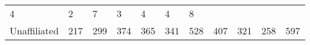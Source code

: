 \documentclass[]{article}
\begin{document}
\begin{longtable}[]{@{}lllllllllll@{}}
\begin{minipage}[t]{0.05\columnwidth}
4\strut
\end{minipage} & \begin{minipage}[t]{0.05\columnwidth}\raggedright\strut
2\strut
\end{minipage} & \begin{minipage}[t]{0.05\columnwidth}\raggedright\strut
7\strut
\end{minipage} & \begin{minipage}[t]{0.06\columnwidth}\raggedright\strut
3\strut
\end{minipage} & \begin{minipage}[t]{0.06\columnwidth}\raggedright\strut
4\strut
\end{minipage} & \begin{minipage}[t]{0.04\columnwidth}\raggedright\strut
4\strut
\end{minipage} & \begin{minipage}[t]{0.11\columnwidth}\raggedright\strut
8\strut
\end{minipage}\tabularnewline
\begin{minipage}[t]{0.14\columnwidth}\raggedright\strut
Unaffiliated\strut
\end{minipage} & \begin{minipage}[t]{0.04\columnwidth}\raggedright\strut
217\strut
\end{minipage} & \begin{minipage}[t]{0.05\columnwidth}\raggedright\strut
299\strut
\end{minipage} & \begin{minipage}[t]{0.05\columnwidth}\raggedright\strut
374\strut
\end{minipage} & \begin{minipage}[t]{0.05\columnwidth}\raggedright\strut
365\strut
\end{minipage} & \begin{minipage}[t]{0.05\columnwidth}\raggedright\strut
341\strut
\end{minipage} & \begin{minipage}[t]{0.05\columnwidth}\raggedright\strut
528\strut
\end{minipage} & \begin{minipage}[t]{0.06\columnwidth}\raggedright\strut
407\strut
\end{minipage} & \begin{minipage}[t]{0.06\columnwidth}\raggedright\strut
321\strut
\end{minipage} & \begin{minipage}[t]{0.04\columnwidth}\raggedright\strut
258\strut
\end{minipage} & \begin{minipage}[t]{0.11\columnwidth}\raggedright\strut
597\strut
\end{minipage}\tabularnewline
\bottomrule
\end{longtable}
\end{document}
